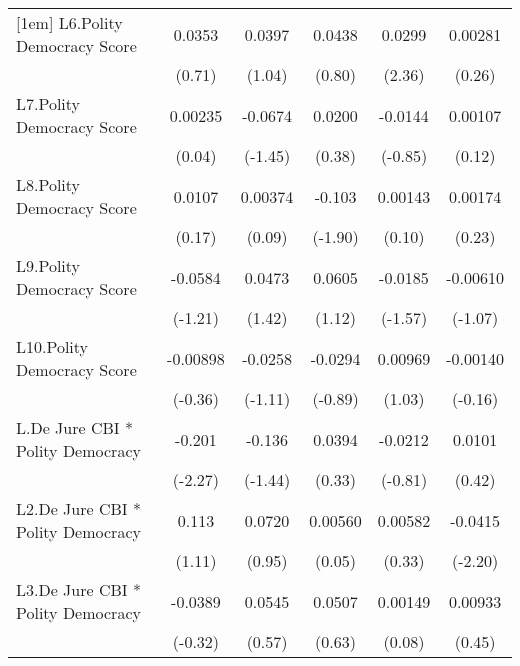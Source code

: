 {\begin{longtable}{l*{5}{c}}
[1em]
L6.Polity Democracy Score&   0.0353         &   0.0397         &   0.0438         &   0.0299\sym{*}  &  0.00281         \\
                &   (0.71)         &   (1.04)         &   (0.80)         &   (2.36)         &   (0.26)         \\
[1em]
L7.Polity Democracy Score&  0.00235         &  -0.0674         &   0.0200         &  -0.0144         &  0.00107         \\
                &   (0.04)         &  (-1.45)         &   (0.38)         &  (-0.85)         &   (0.12)         \\
[1em]
L8.Polity Democracy Score&   0.0107         &  0.00374         &   -0.103         &  0.00143         &  0.00174         \\
                &   (0.17)         &   (0.09)         &  (-1.90)         &   (0.10)         &   (0.23)         \\
[1em]
L9.Polity Democracy Score&  -0.0584         &   0.0473         &   0.0605         &  -0.0185         & -0.00610         \\
                &  (-1.21)         &   (1.42)         &   (1.12)         &  (-1.57)         &  (-1.07)         \\
[1em]
L10.Polity Democracy Score& -0.00898         &  -0.0258         &  -0.0294         &  0.00969         & -0.00140         \\
                &  (-0.36)         &  (-1.11)         &  (-0.89)         &   (1.03)         &  (-0.16)         \\
[1em]
L.De Jure CBI * Polity Democracy&   -0.201\sym{*}  &   -0.136         &   0.0394         &  -0.0212         &   0.0101         \\
                &  (-2.27)         &  (-1.44)         &   (0.33)         &  (-0.81)         &   (0.42)         \\
[1em]
L2.De Jure CBI * Polity Democracy&    0.113         &   0.0720         &  0.00560         &  0.00582         &  -0.0415\sym{*}  \\
                &   (1.11)         &   (0.95)         &   (0.05)         &   (0.33)         &  (-2.20)         \\
[1em]
L3.De Jure CBI * Polity Democracy&  -0.0389         &   0.0545         &   0.0507         &  0.00149         &  0.00933         \\
                &  (-0.32)         &   (0.57)         &   (0.63)         &   (0.08)         &   (0.45)         \\

\end{longtable}}
